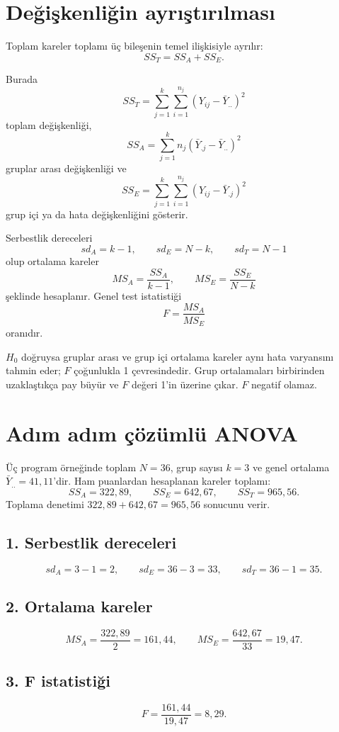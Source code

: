 \section{Değişkenliğin ayrıştırılması}

Toplam kareler toplamı üç bileşenin temel ilişkisiyle ayrılır:
\[
SS_T=SS_A+SS_E.
\]

Burada
\[
SS_T=\sum_{j=1}^k\sum_{i=1}^{n_j}
(Y_{ij}-\bar Y_{..})^2
\]
toplam değişkenliği,
\[
SS_A=\sum_{j=1}^k n_j
(\bar Y_{.j}-\bar Y_{..})^2
\]
gruplar arası değişkenliği ve
\[
SS_E=\sum_{j=1}^k\sum_{i=1}^{n_j}
(Y_{ij}-\bar Y_{.j})^2
\]
grup içi ya da hata değişkenliğini gösterir.

Serbestlik dereceleri
\[
sd_A=k-1,
\qquad
sd_E=N-k,
\qquad
sd_T=N-1
\]
olup ortalama kareler
\[
MS_A=\frac{SS_A}{k-1},
\qquad
MS_E=\frac{SS_E}{N-k}
\]
şeklinde hesaplanır. Genel test istatistiği
\[
F=\frac{MS_A}{MS_E}
\]
oranıdır.

$H_0$ doğruysa gruplar arası ve grup içi ortalama kareler aynı hata
varyansını tahmin eder; $F$ çoğunlukla 1 çevresindedir. Grup ortalamaları
birbirinden uzaklaştıkça pay büyür ve $F$ değeri 1'in üzerine çıkar. $F$
negatif olamaz.

\section{Adım adım çözümlü ANOVA}

Üç program örneğinde toplam $N=36$, grup sayısı $k=3$ ve genel ortalama
$\bar Y_{..}=41{,}11$'dir. Ham puanlardan hesaplanan kareler toplamı:
\[
SS_A=322{,}89,
\qquad
SS_E=642{,}67,
\qquad
SS_T=965{,}56.
\]
Toplama denetimi $322{,}89+642{,}67=965{,}56$ sonucunu verir.

\subsection*{1. Serbestlik dereceleri}
\[
sd_A=3-1=2,
\qquad
sd_E=36-3=33,
\qquad
sd_T=36-1=35.
\]

\subsection*{2. Ortalama kareler}
\[
MS_A=\frac{322{,}89}{2}=161{,}44,
\qquad
MS_E=\frac{642{,}67}{33}=19{,}47.
\]

\subsection*{3. F istatistiği}
\[
F=\frac{161{,}44}{19{,}47}=8{,}29.
\]

